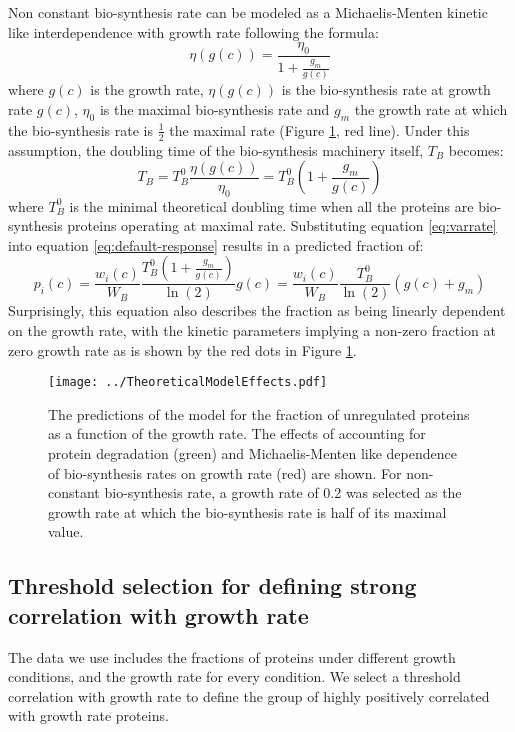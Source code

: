 \documentclass{article}
\begin{document}
Non constant bio-synthesis rate can be modeled as a Michaelis-Menten kinetic like interdependence with growth rate following the formula:
\begin{equation}
\eta(g(c))=\frac{\eta_0}{1+\frac{g_m}{g(c)}}
\end{equation}
where $g(c)$ is the growth rate, $\eta(g(c))$ is the bio-synthesis rate at growth rate $g(c)$, $\eta_0$ is the maximal bio-synthesis rate and $g_m$ the growth rate at which the bio-synthesis rate is $\frac{1}{2}$ the maximal rate (Figure \ref{fig:theoreticalpred}, red line).
Under this assumption, the doubling time of the bio-synthesis machinery itself, $T_B$ becomes:
\begin{equation}
\label{eq:varrate}
T_B=T_B^0\frac{\eta(g(c))}{\eta_0}=T_B^0(1+\frac{g_m}{g(c)})
\end{equation}
where $T_B^0$ is the minimal theoretical doubling time when all the proteins are bio-synthesis proteins operating at maximal rate.
Substituting equation \ref{eq:varrate} into equation \ref{eq:default-response} results in a predicted fraction of:
\begin{equation}
p_i(c)=\frac{w_i(c)}{W_B}\frac{T_B^0(1+\frac{g_m}{g(c)})}{\ln(2)}g(c) = \frac{w_i(c)}{W_B}\frac{T_B^0}{\ln(2)}(g(c)+g_m)
\end{equation}
Surprisingly, this equation also describes the fraction as being linearly dependent on the growth rate, with the kinetic parameters implying a non-zero fraction at zero growth rate as is shown by the red dots in Figure \ref{fig:theoreticalpred}.


\begin{figure}[H]
\begin{center}
\texttt{[image: ../TheoreticalModelEffects.pdf]}
\caption{\label{fig:theoreticalpred}
The predictions of the model for the fraction of unregulated proteins as a function of the growth rate.
The effects of accounting for protein degradation (green) and Michaelis-Menten like dependence of bio-synthesis rates on growth rate (red) are shown.
For non-constant bio-synthesis rate, a growth rate of 0.2 was selected as the growth rate at which the bio-synthesis rate is half of its maximal value.%
}
\end{center}
\end{figure}

\subsection{Threshold selection for defining strong correlation with growth rate}
\label{corrthreshold} 
The data we use includes the fractions of proteins under different growth conditions, and the growth rate for every condition.
We select a threshold correlation with growth rate to define the group of highly positively correlated with growth rate proteins.
\end{document}
